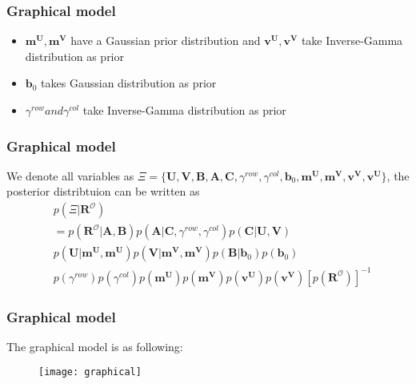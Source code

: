 \documentclass{beamer}
\newcommand{\vect}[1]{\boldsymbol{\mathbf{#1}}} %
\newcommand{\vb}{\vect{b}}
\newcommand{\vB}{\vect{B}}
\newcommand{\vC}{\vect{C}}
\newcommand{\vU}{\vect{U}}
\newcommand{\vV}{\vect{V}}
\newcommand{\vv}{\vect{v}}
\newcommand{\vm}{\vect{m}}
\newcommand{\vR}{\vect{R}}
\newcommand{\vA}{\vect{A}}
\begin{document}
\begin{frame}
    \frametitle{Graphical model}
\begin{itemize}
    \item $\vm^{\vU}, \vm^{\vV}$ have a Gaussian prior distribution and $\vv^{\vU}, \vv^{\vV}$ take Inverse-Gamma distribution as prior 
    \item $\vb_0$ takes Gaussian distribution as prior
    \item $\gamma^{row} and \gamma^{col}$ take Inverse-Gamma distribution as prior
\end{itemize}
\end{frame}
\begin{frame}
    \frametitle{Graphical model}
    We denote all variables as $\Xi = \{\vU, \vV, \vB, \vA, \vC, \gamma^{row}, \gamma^{col}, \vb_0, \vm^{\vU},
    \vm^{\vV}, \vv^{\vV}, \vv^{\vU}\}$, the posterior distribtuion can be written as
    \begin{equation*}
	\begin{split}
	&p(\Xi|\vR^{\mathcal{O}}) \\
	&= p(\vR^{\mathcal{O}}|\vA, \vB) p(\vA|\vC, \gamma^{row}, \gamma^{col})p(\vC|\vU, \vV)\\
	&p(\vU|\vm^{\vU}, \vm^{\vU})p(\vV|\vm^{\vV}, \vm^{\vV})p(\vB|\vb_0)p(\vb_0)\\
	&p(\gamma^{row})p(\gamma^{col})p(\vm^{\vU})p(\vm^{\vV})p(\vv^{\vU})p(\vv^{\vV})[p(\vR^{\mathcal{O}})]^{-1}
	\end{split}
    \end{equation*}
\end{frame}
\begin{frame}
    \frametitle{Graphical model}
    The graphical model is as following:
    \begin{figure}
	\centering
	\texttt{[image: graphical]}
    \end{figure}
\end{frame}
\end{document}
